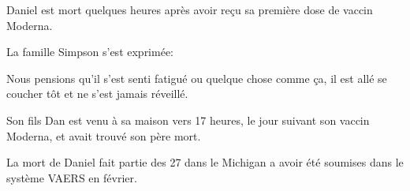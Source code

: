 Daniel est mort quelques heures après avoir reçu sa première dose de vaccin
Moderna.

La famille Simpson s'est exprimée:

Nous pensions qu'il s'est senti fatigué ou quelque chose comme ça, il est allé
se coucher tôt et ne s'est jamais réveillé.

Son fils Dan est venu à sa maison vers 17 heures, le jour suivant son vaccin
Moderna, et avait trouvé son père mort.

La mort de Daniel fait partie des 27 dans le Michigan a avoir été soumises dans
le système VAERS en février.

